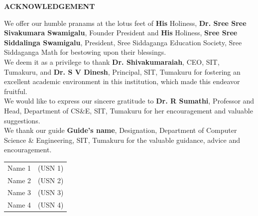 \begin{titlepage}
\begin{center}
{\Large \textbf{ACKNOWLEDGEMENT}}
\end{center}

We offer our humble pranams at the lotus feet of \textbf{His} Holiness, \textbf{Dr. Sree Sree Sivakumara Swamigalu}, Founder President and \textbf{His} Holiness, \textbf{Sree Sree Siddalinga Swamigalu}, President, Sree Siddaganga Education Society, Sree Siddaganga Math for bestowing upon their blessings.\\

We deem it as a privilege to thank \textbf{Dr. Shivakumaraiah}, CEO, SIT, Tumakuru,  and \textbf{Dr. S V Dinesh}, Principal, SIT, Tumakuru for fostering an excellent academic environment in this institution, which made this endeavor fruitful.\\

We would like to express our sincere gratitude to \textbf{Dr. R Sumathi}, Professor and Head, Department of CS\&E, SIT, Tumakuru for her encouragement and valuable suggestions.\\

We thank our guide \textbf{Guide's name}, Designation, Department of Computer Science \& Engineering, SIT, Tumakuru for the valuable guidance, advice and encouragement.\\


\begin{flushright}
\begin{tabular}{ll}
Name 1 & (USN 1)  \\
Name 2 & (USN 2)  \\
Name 3 & (USN 3)  \\
Name 4 & (USN 4)  \\
\end{tabular}\\[1.5cm]
\end{flushright}
\end{titlepage}